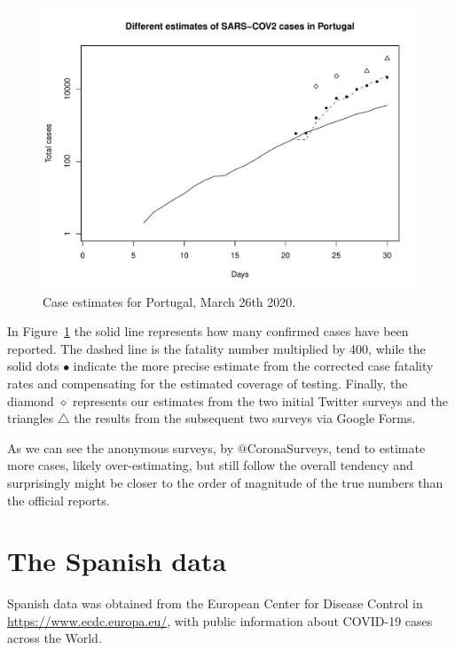 \documentclass{article}
\begin{document}
\begin{figure}
\begin{center}
\includegraphics[width=.9\linewidth]{EstPTMar26.pdf}
\end{center}
\caption{Case estimates for Portugal, March 26th 2020.}
\label{pt}
\end{figure}

In Figure~\ref{pt} the solid line represents how many confirmed cases have been reported. The dashed line is the fatality number multiplied by 400, while the solid dots $\bullet$ indicate the more precise estimate from the corrected case fatality rates and compensating for the estimated coverage of testing. Finally, the diamond $\diamond$ represents our estimates from the two initial Twitter surveys and the triangles $\triangle$ the results from the subsequent two surveys via Google Forms. 

As we can see the anonymous surveys, by $@$CoronaSurveys, tend to estimate more cases, likely over-estimating, but still follow the overall tendency and surprisingly might be closer to the order of magnitude of the true numbers than the official reports. 

\section{The Spanish data}

Spanish data was obtained from the European Center for Disease Control in \url{https://www.ecdc.europa.eu/}, with public information about COVID-19 cases across the World. 
\end{document}

